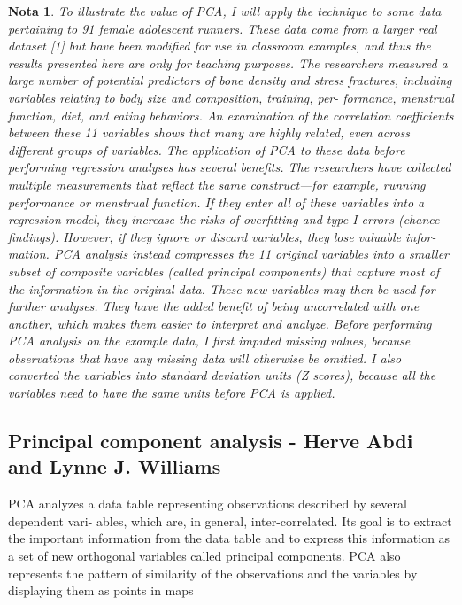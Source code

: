 \documentclass[12pt]{article}
\newtheorem{Note}{Nota}%
\begin{document}
\begin{Note}
To illustrate the value of PCA, I will apply the technique to some data pertaining to 91 female adolescent runners. These data come from a larger real dataset [1] but have been modified for use in classroom examples, and thus the results presented here are only for teaching purposes. The researchers measured a large number of potential predictors of bone density and stress fractures, including variables relating to body size and composition, training, per- formance, menstrual function, diet, and eating behaviors. An examination of the correlation coefficients between these 11 variables shows that many are highly related, even across different groups of variables. The application of PCA to these data before performing regression analyses has several benefits. The researchers have collected multiple measurements that reflect the same construct—for example, running performance or menstrual function. If they enter all of these variables into a regression model, they increase the risks of overfitting and type I errors (chance findings). However, if they ignore or discard variables, they lose valuable infor- mation. PCA analysis instead compresses the 11 original variables into a smaller subset of composite variables (called principal components) that capture most of the information in the original data. These new variables may then be used for further analyses. They have the added benefit of being uncorrelated with one another, which makes them easier to interpret and analyze. Before performing PCA analysis on the example data, I first imputed missing values, because observations that have any missing data will otherwise be omitted. I also converted the variables into standard deviation units (Z scores), because all the variables need to have the same units before PCA is applied.
\end{Note}

\subsection{Principal component analysis - 
Herve  Abdi  and Lynne J. Williams}


PCA analyzes a data table representing observations described by several dependent vari- ables, which are, in general, inter-correlated. Its goal is to extract the important information from the data table and to express this information as a set of new orthogonal variables called principal components. PCA also represents the pattern of similarity of the observations and the variables by displaying them as points in maps
\end{document}
